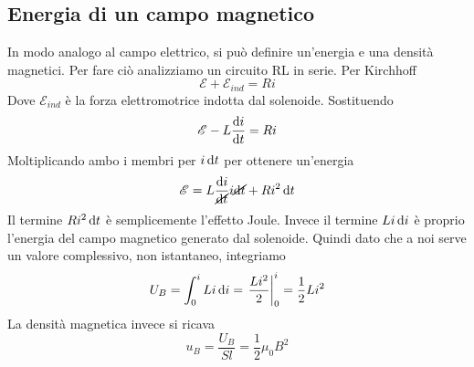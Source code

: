 \subsection{Energia di un campo magnetico}
In modo analogo al campo elettrico, si può definire un'energia e una densità magnetici. Per fare 
ciò analizziamo un circuito RL in serie. Per Kirchhoff
\begin{equation*}
  \mathcal{E} + \mathcal{E}_{ind} = Ri
\end{equation*}
Dove $\mathcal{E}_{ind}$ è la forza elettromotrice indotta dal solenoide. Sostituendo
\begin{equation*}
  \mathcal{E} -L\frac{\mathop{}\!\mathrm{d} i}{\mathop{}\!\mathrm{d} t} = Ri
\end{equation*}
Moltiplicando ambo i membri per $i\mathop{}\!\mathrm{d} t$ per ottenere un'energia
\begin{equation*}
  \mathcal{E} = L\frac{\mathop{}\!\mathrm{d} i}{\cancel{\mathop{}\!\mathrm{d} t}}i\cancel{\mathop{}\!\mathrm{d} t}+Ri^2\mathop{}\!\mathrm{d} t
\end{equation*}
Il termine $Ri^2\mathop{}\!\mathrm{d} t$ è semplicemente l'effetto Joule. Invece il termine $Li\mathop{}\!\mathrm{d} i$ è proprio
l'energia del campo magnetico generato dal solenoide. Quindi dato che a noi serve un valore
complessivo, non istantaneo, integriamo
\begin{equation*}
  U_B = \int_0^i Li\mathop{}\!\mathrm{d} i = \left.\frac{Li^2}{2}\right|_0^i = \frac{1}{2}Li^2
\end{equation*}
La densità magnetica invece si ricava
\begin{equation*}
  u_B = \frac{U_B}{Sl} = \frac{1}{2}\mu_0B^2
\end{equation*}

